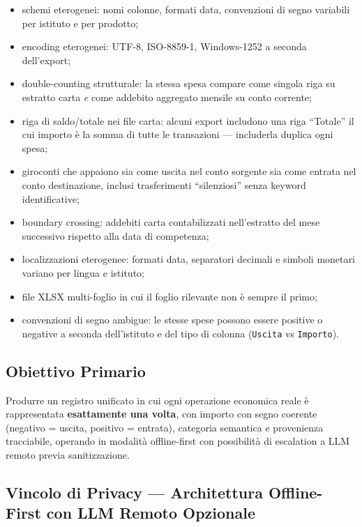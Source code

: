 \documentclass[11pt, a4paper]{article}
\begin{document}
\begin{itemize}[leftmargin=2em]
  \item schemi eterogenei: nomi colonne, formati data, convenzioni di segno variabili per
        istituto e per prodotto;
  \item encoding eterogenei: UTF-8, ISO-8859-1, Windows-1252 a seconda dell'export;
  \item double-counting strutturale: la stessa spesa compare come singola riga su estratto
        carta \emph{e} come addebito aggregato mensile su conto corrente;
  \item riga di saldo/totale nei file carta: alcuni export includono una riga ``Totale''
        il cui importo è la somma di tutte le transazioni --- includerla duplica ogni spesa;
  \item giroconti che appaiono sia come uscita nel conto sorgente sia come entrata nel
        conto destinazione, inclusi trasferimenti ``silenziosi'' senza keyword
        identificative;
  \item boundary crossing: addebiti carta contabilizzati nell'estratto del mese successivo
        rispetto alla data di competenza;
  \item localizzazioni eterogenee: formati data, separatori decimali e simboli monetari
        variano per lingua e istituto;
  \item file XLSX multi-foglio in cui il foglio rilevante non è sempre il primo;
  \item convenzioni di segno ambigue: le stesse spese possono essere positive o negative
        a seconda dell'istituto e del tipo di colonna (\texttt{Uscita} vs \texttt{Importo}).
\end{itemize}

\subsection{Obiettivo Primario}

Produrre un registro unificato in cui ogni operazione economica reale è rappresentata
\textbf{esattamente una volta}, con importo con segno coerente (negativo = uscita,
positivo = entrata), categoria semantica e provenienza tracciabile, operando in modalità
offline-first con possibilità di escalation a LLM remoto previa sanitizzazione.

\subsection{Vincolo di Privacy --- Architettura Offline-First con LLM Remoto Opzionale}
\end{document}

